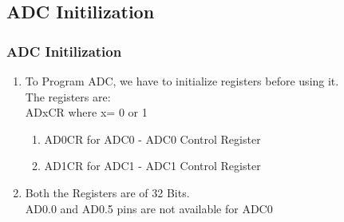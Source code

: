 \documentclass[table,10pt,red]{beamer}
\begin{document}
\subsection{ADC Initilization}
\begin{frame}
	\frametitle{ADC Initilization}	\pause
	\begin{enumerate}[$\checkmark$]
		\item <+-|alert@+>	To Program ADC, we have to initialize registers before using it.  \\[10pt] 
		The registers are:\pause \\[10pt]
		\color{red}ADxCR \color{black} where x= 0 or 1 \\[10pt] \pause
		\begin{enumerate}
		 	\item <+-|alert@+> \color{red} AD0CR for ADC0 \color{black} - ADC0 Control Register\\[5pt] \pause
	       \item <+-|alert@+> \color{red} AD1CR for ADC1 \color{black} - ADC1 Control Register\\[5pt]	\pause
		\end{enumerate}
		\item <+-|alert@+> Both the Registers are of 32 Bits. \pause
		\\[20pt]
		\color{red}{NOTE: }\color{black}AD0.0 and AD0.5 pins are not available for ADC0 \pause
	\end{enumerate}
\end{frame}
\end{document}
